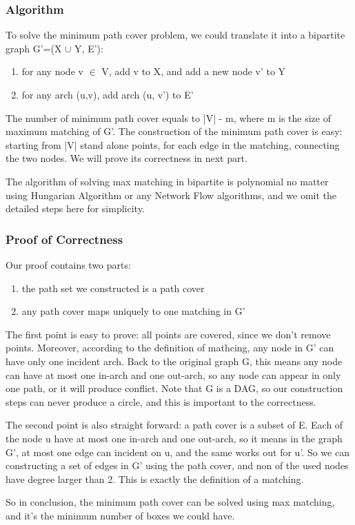 \documentclass[paper=a4, fontsize=11pt]{scrartcl} %
\numberwithin{equation}{section} %
\numberwithin{figure}{section} %
\numberwithin{table}{section} %
\begin{document}
\subsubsection*{\textbf{Algorithm}}
To solve the minimum path cover problem, we could translate it into a bipartite
graph G'=(X $\cup$ Y, E'):
\begin{enumerate}
\item for any node v $\in$ V, add v to X, and add a new node v' to Y
\item for any arch (u,v), add arch (u, v') to E'
\end{enumerate}
The number of minimum path cover equals to |V| - m, where m is the size of
maximum matching of G'. The construction of the minimum path cover is easy:
starting from |V| stand alone points, for each edge in the matching, connecting
the two nodes. We will prove its correctness in next part.

The algorithm of solving max matching in bipartite is polynomial no matter
using Hungarian Algorithm or any Network Flow algorithms, and we omit the
detailed steps here for simplicity.

\subsubsection*{\textbf{Proof of Correctness}}
Our proof contains two parts:
\begin{enumerate}
\item the path set we constructed is a path cover
\item any path cover maps uniquely to one matching in G'
\end{enumerate}

The first point is easy to prove: all points are covered, since we don't remove
points.  Moreover, according to the definition of mathcing, any node in G' can
have only one incident arch. Back to the original graph G, this means any node
can have at most one in-arch and one out-arch, so any node can appear in only
one path, or it will produce conflict. Note that G is a DAG, so our
construction steps can never produce a circle, and this is important to the
correctness.

The second point is also straight forward: a path cover is a subset of E. Each
of the node u have at most one in-arch and one out-arch, so it means in the
graph G', at most one edge can incident on u, and the same works out for u'. So
we can constructing a set of edges in G' using the path cover, and non of the
used nodes have degree larger than 2. This is exactly the definition of a
matching.

So in conclusion, the minimum path cover can be solved using max matching, and
it's the minimum number of boxes we could have.
\end{document}
